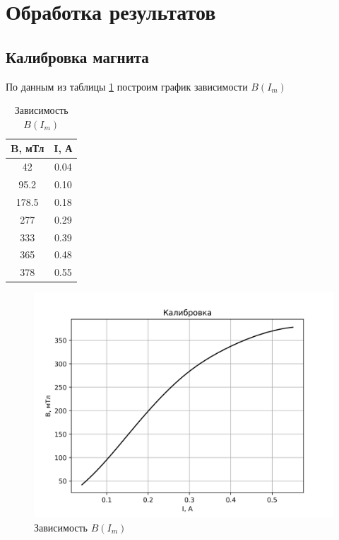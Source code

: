 \documentclass[a4paper, 12pt]{article}
\begin{document}
\section{Обработка результатов}
\subsection*{Калибровка магнита}
По данным из таблицы \ref{tab:cal} построим график зависимости $B(I_m)$
\begin{table}[H]
	\centering
	\begin{tabular}{|c|c|}
	\hline
	\textbf{B, мТл} & \textbf{I, А} \\ \hline
	42              & 0.04          \\ \hline
	95.2            & 0.10          \\ \hline
	178.5           & 0.18          \\ \hline
	277             & 0.29          \\ \hline
	333             & 0.39          \\ \hline
	365             & 0.48          \\ \hline
	378             & 0.55          \\ \hline
	\end{tabular}
	\caption{Зависимость $B(I_m)$}
	\label{tab:cal}
\end{table}
\begin{figure}[H]
    \centering
    \includegraphics[width=1\textwidth]{calibration.png}
    \caption{Зависимость $B(I_m)$}
    \label{fig:cal}
\end{figure}
\end{document}
